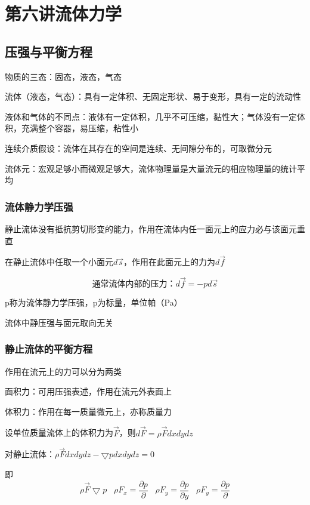 \documentclass[UTF8]{article}
\begin{document}
\section{第六讲\;\;流体力学}
\subsection{压强与平衡方程}

    物质的三态：固态，液态，气态

    流体（液态，气态）：具有一定体积、无固定形状、易于变形，具有一定的流动性

    液体和气体的不同点：液体有一定体积，几乎不可压缩，黏性大；气体没有一定体积，充满整个容器，易压缩，粘性小

    连续介质假设：流体在其存在的空间是连续、无间隙分布的，可取微分元

    流体元：宏观足够小而微观足够大，流体物理量是大量流元的相应物理量的统计平均

\subsubsection{流体静力学压强}

    静止流体没有抵抗剪切形变的能力，作用在流体内任一面元上的应力必与该面元垂直

    在静止流体中任取一个小面元$d\vec{s}$，作用在此面元上的力为$d\vec{f}$

    \[\mbox{通常流体内部的压力：}d\vec{f} = -pd\vec{s}\]

    p称为流体静力学压强，p为标量，单位帕（Pa）

    流体中静压强与面元取向无关

\subsubsection{静止流体的平衡方程}

    作用在流元上的力可以分为两类

    面积力：可用压强表述，作用在流元外表面上

    体积力：作用在每一质量微元上，亦称质量力

    设单位质量流体上的体积力为$\vec{F}$，则$d\vec{F} = \rho \vec{F}dxdydz$

    对静止流体：$\rho \vec{F}dxdydz - \bigtriangledown pdxdydz = 0$

    即\[\rho \vec{F}\bigtriangledown p\;\;\;\rho F_x = \frac{\partial p}{\partial}\;\;\;\rho F_y = \frac{\partial p}{\partial y}\;\;\;\rho F_y = \frac{\partial p}{\partial }\]
\end{document}
